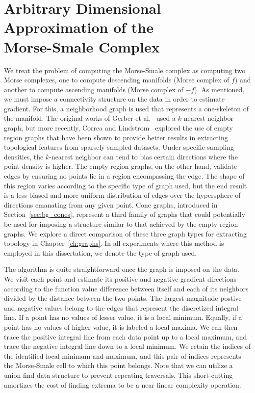 \clearpage
\section{Arbitrary Dimensional Approximation of the\\Morse-Smale Complex}
\label{sec:approximationMSC}

We treat the problem of computing the Morse-Smale complex as computing two Morse complexes, one to compute descending manifolds (Morse complex of $f$) and another to compute ascending manifolds (Morse complex of $-f$).
%
As mentioned, we must impose a connectivity structure on the data in order to estimate gradient.
%
For this, a neighborhood graph is used that represents a one-skeleton of the manifold.
%
The original works of Gerber et al.~\cite{GerberBremerPascucci2010,GerberPotter2012,GerberRubelBremer2011} used a $k$-nearest neighbor graph, but more recently, Correa and Lindstrom~\cite{CorreaLindstrom2011} explored the use of empty region graphs that have been shown to provide better results in extracting topological features from sparsely sampled datasets.
%
Under specific sampling densities, the $k$-nearest neighbor can tend to bias certain directions where the point density is higher.
%
The empty region graphs, on the other hand, validate edges by ensuring no points lie in a region encompassing the edge.
%
The shape of this region varies according to the specific type of graph used, but the end result is a less biased and more uniform distribution of edges over the hypersphere of directions emanating from any given point.
%
Cone graphs, introduced in Section~\ref{sec:bg_cones}, represent a third family of graphs that could potentially be used for imposing a structure similar to that achieved by the empty region graphs.
%
We explore a direct comparison of these three graph types for extracting topology in Chapter~\ref{ch:graphs}.
%
In all experiments where this method is employed in this dissertation, we denote the type of graph used.

The algorithm is quite straightforward once the graph is imposed on the data.
%
We visit each point and estimate its positive and negative gradient directions according to the function value difference between itself and each of its neighbors divided by the distance between the two points.
%
The largest magnitude postive and negative values belong to the edges that represent the discretized integral line.
%
If a point has no values of lesser value, it is a local minimum.
%
Equally, if a point has no values of higher value, it is labeled a local maxima.
%
We can then trace the positive integral line from each data point up to a local maximum, and trace the negative integral line down to a local minimum.
%
We retain the indices of the identified local minimum and maximum, and this pair of indices represents the Morse-Smale cell to which this point belongs.
%
Note that we can utilize a union-find data structure to prevent repeating traversals.
%
This short-cutting amortizes the cost of finding extrema to be a near linear complexity operation.

